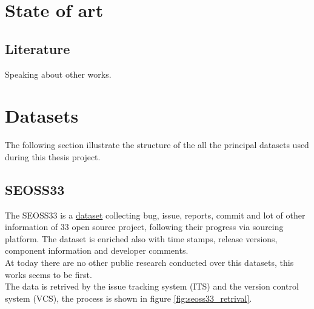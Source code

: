 \documentclass[%
    corpo=12pt,
    twoside,
    oldstyle,
    autoretitolo,
    greek,
    evenboxes,
]{toptesi}
\begin{document}
\chapter{State of art}
\section{Literature}
Speaking about other works.


\chapter{Datasets}
The following section illustrate the structure of the all the principal datasets used during this thesis project.
\section{SEOSS33}
The SEOSS33\cite{SEOSS33} is a \href{https://doi.org/10.7910/DVN/PDDZ4Q}{dataset} collecting bug, issue, reports, commit and lot of other information of 33 open source project, following their progress via sourcing platform. The dataset is enriched also with time stamps, release versions, component information and developer comments.\\
At today there are no other public research conducted over this datasets, this works seems to be first.\\
The data is retrived by the issue tracking system (ITS) and the version control system (VCS), the process is shown in figure \ref{fig:seoss33_retrival}.
\end{document}
